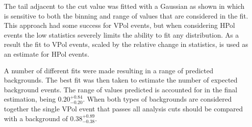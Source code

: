 The tail adjacent to the cut value was fitted with a Gaussian as shown in  which is sensitive to both the binning and range of values that are considered in the fit. This approach had some success for VPol events, but when considering HPol events the low statistics severely limits the ability to fit any distribution. As a result the fit to VPol events, scaled by the relative change in statistics, is used as an estimate for HPol events.

A number of different fits were made resulting in a range of predicted backgrounds. The best fit was then taken to estimate the number of expected background events. The range of values predicted is accounted for in the final estimation, being $0.20^{+0.84}_{-0.20}$. When both types of backgrounds are considered together the single VPol event that passes all analysis cuts should be compared with a background of $0.38^{+0.89}_{-0.38}$.


